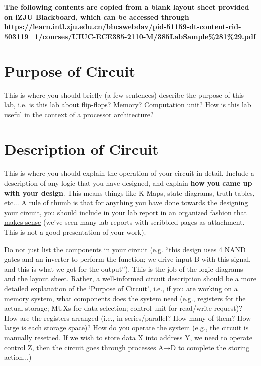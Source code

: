 \documentclass[libertinus]{../lab-report}
\begin{document}
    

    {\bfseries The following contents are copied from a blank layout sheet provided on iZJU Blackboard, which can be accessed through \url{https://learn.intl.zju.edu.cn/bbcswebdav/pid-51159-dt-content-rid-503119_1/courses/UIUC-ECE385-2110-M/385LabSample%281%29.pdf} }

    \section{Purpose of Circuit}
    This is where you should briefly (a few sentences) describe the purpose of this lab, i.e. is 
    this lab about flip-flops? Memory? Computation unit? How is this lab useful in the 
    context of a processor architecture?

    \section{Description of Circuit}
    This is where you should explain the operation of your circuit in detail. Include a 
    description of any logic that you have designed, and explain \textbf{how you came up with 
    your design}. This means things like K-Maps, state diagrams, truth tables, etc... A rule 
    of thumb is that for anything you have done towards the designing your circuit, you 
    should include in your lab report in an \underline{organized} fashion that \underline{makes sense} (we've seen 
    many lab reports with scribbled pages as attachment. This is not a good presentation of 
    your work).

    Do not just list the components in your circuit (e.g. ``this design uses 4 NAND gates and 
    an inverter to perform the function; we drive input B with this signal, and this is what we 
    got for the output''). This is the job of the logic diagrams and the layout sheet. Rather, a 
    well-informed circuit description should be a more detailed explanation of the `Purpose 
    of Circuit', i.e., if you are working on a memory system, what components does the 
    system need (e.g., registers for the actual storage; MUXs for data selection; control unit 
    for read/write request)? How are the registers arranged (i.e., in series/parallel? How 
    many of them? How large is each storage space)? How do you operate the system (e.g., 
    the circuit is manually resetted. If we wish to store data X into address Y, we need to 
    operate control Z, then the circuit goes through processes A→D to complete the storing 
    action...)
\end{document}
